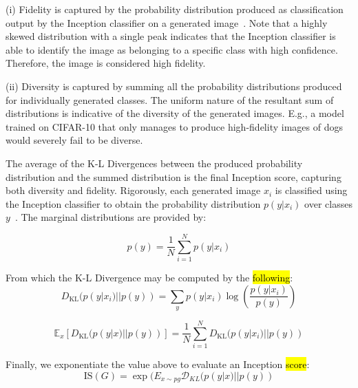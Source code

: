 \documentclass[technologies,article,accept,pdftex,moreauthors]{Definitions/mdpi}
\begin{document}
(i) Fidelity is captured by the probability distribution produced as classification output by the Inception classifier on a generated image~\cite{mack_2019}. Note that a highly skewed distribution with a single peak indicates that the Inception classifier is able to identify the image as belonging to a specific class with high confidence. Therefore, the image is considered high fidelity.



(ii) Diversity is captured by summing all the probability distributions produced for individually generated classes. The uniform nature of the resultant sum of distributions is indicative of the diversity of the generated images. E.g., a model trained on CIFAR-10 that only manages to produce high-fidelity images of dogs would severely fail to be diverse.



The average of the K-L Divergences between the produced probability distribution and the summed distribution is the final Inception score, capturing both diversity and fidelity.
Rigorously, each generated image $x_i$ is classified using the Inception classifier to obtain the probability distribution $p(y|x_i)$ over classes $y$~\cite{isscore}. The marginal distributions are provided by: 

\begin{equation}
p(y) = \frac{1}{N} \sum_{i=1}^{N} p(y|x_i)
\end{equation}

From which the K-L Divergence may be computed by the \hl{following}:%
\begin{equation}
    D_{\text{KL}}(p(y|x_i) || p(y)) = \sum_{y} p(y|x_i) \log \left( \frac{p(y|x_i)}{p(y)} \right)
\end{equation}

\begin{equation}
    \mathbb{E}_{x}[D_{\text{KL}}(p(y|x) || p(y))] = \frac{1}{N} \sum_{i=1}^{N} D_{\text{KL}}(p(y|x_i) || p(y)) 
\end{equation}

Finally, we exponentiate the value above to evaluate an Inception \hl{score}:
\begin{equation}
\text{IS}(G) = \exp (E_{x\sim pg} \mathcal{D}_{KL}(p(y|x) || p(y))
\end{equation}
\end{document}
